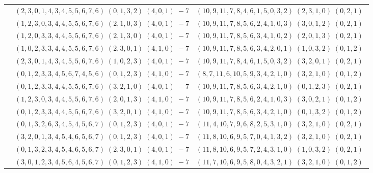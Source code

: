 \documentclass[11pt]{article}
\begin{document}
\begin{longtable}[l]{|c|c|c|}
 \cline{2-3} 
 & $(2 ,3 ,0 ,1 ,4 ,3 ,4 ,5 ,5 ,6 ,7 ,6) \;(0 ,1 ,3 ,2) \;(4 ,0 ,1) \;-7$ & $(10 ,9 ,11 ,7 ,8 ,4 ,6 ,1 ,5 ,0 ,3 ,2) \;(2 ,3 ,1 ,0) \;(0 ,2 ,1) \;$\\ 
 \cline{2-3} 
 & $(1 ,2 ,3 ,0 ,3 ,4 ,4 ,5 ,5 ,6 ,7 ,6) \;(2 ,1 ,0 ,3) \;(4 ,0 ,1) \;-7$ & $(10 ,9 ,11 ,7 ,8 ,5 ,6 ,2 ,4 ,1 ,0 ,3) \;(3 ,0 ,1 ,2) \;(0 ,2 ,1) \;$\\ 
 \cline{2-3} 
 & $(1 ,2 ,0 ,3 ,3 ,4 ,4 ,5 ,5 ,6 ,7 ,6) \;(2 ,1 ,3 ,0) \;(4 ,0 ,1) \;-7$ & $(10 ,9 ,11 ,7 ,8 ,5 ,6 ,3 ,4 ,1 ,0 ,2) \;(2 ,0 ,1 ,3) \;(0 ,2 ,1) \;$\\ 
 \cline{2-3} 
 & $(1 ,0 ,2 ,3 ,3 ,4 ,4 ,5 ,5 ,6 ,7 ,6) \;(2 ,3 ,0 ,1) \;(4 ,1 ,0) \;-7$ & $(10 ,9 ,11 ,7 ,8 ,5 ,6 ,3 ,4 ,2 ,0 ,1) \;(1 ,0 ,3 ,2) \;(0 ,1 ,2) \;$\\ 
 \cline{2-3} 
 & $(2 ,3 ,0 ,1 ,4 ,3 ,4 ,5 ,5 ,6 ,7 ,6) \;(1 ,0 ,2 ,3) \;(4 ,0 ,1) \;-7$ & $(10 ,9 ,11 ,7 ,8 ,4 ,6 ,1 ,5 ,0 ,3 ,2) \;(3 ,2 ,0 ,1) \;(0 ,2 ,1) \;$\\ 
 \cline{2-3} 
 & $(0 ,1 ,2 ,3 ,3 ,4 ,5 ,6 ,7 ,4 ,5 ,6) \;(0 ,1 ,2 ,3) \;(4 ,1 ,0) \;-7$ & $(8 ,7 ,11 ,6 ,10 ,5 ,9 ,3 ,4 ,2 ,1 ,0) \;(3 ,2 ,1 ,0) \;(0 ,1 ,2) \;$\\ 
 \cline{2-3} 
 & $(0 ,1 ,2 ,3 ,3 ,4 ,4 ,5 ,5 ,6 ,7 ,6) \;(3 ,2 ,1 ,0) \;(4 ,0 ,1) \;-7$ & $(10 ,9 ,11 ,7 ,8 ,5 ,6 ,3 ,4 ,2 ,1 ,0) \;(0 ,1 ,2 ,3) \;(0 ,2 ,1) \;$\\ 
 \cline{2-3} 
 & $(1 ,2 ,3 ,0 ,3 ,4 ,4 ,5 ,5 ,6 ,7 ,6) \;(2 ,0 ,1 ,3) \;(4 ,1 ,0) \;-7$ & $(10 ,9 ,11 ,7 ,8 ,5 ,6 ,2 ,4 ,1 ,0 ,3) \;(3 ,0 ,2 ,1) \;(0 ,1 ,2) \;$\\ 
 \cline{2-3} 
 & $(0 ,1 ,2 ,3 ,3 ,4 ,4 ,5 ,5 ,6 ,7 ,6) \;(3 ,2 ,0 ,1) \;(4 ,1 ,0) \;-7$ & $(10 ,9 ,11 ,7 ,8 ,5 ,6 ,3 ,4 ,2 ,1 ,0) \;(0 ,1 ,3 ,2) \;(0 ,1 ,2) \;$\\ 
 \cline{2-3} 
 & $(0 ,1 ,3 ,2 ,6 ,3 ,4 ,5 ,4 ,5 ,6 ,7) \;(0 ,1 ,2 ,3) \;(4 ,0 ,1) \;-7$ & $(11 ,4 ,10 ,7 ,9 ,6 ,8 ,2 ,5 ,3 ,1 ,0) \;(3 ,2 ,1 ,0) \;(0 ,2 ,1) \;$\\ 
 \cline{2-3} 
 & $(3 ,2 ,0 ,1 ,3 ,4 ,5 ,4 ,6 ,5 ,6 ,7) \;(0 ,1 ,2 ,3) \;(4 ,0 ,1) \;-7$ & $(11 ,8 ,10 ,6 ,9 ,5 ,7 ,0 ,4 ,1 ,3 ,2) \;(3 ,2 ,1 ,0) \;(0 ,2 ,1) \;$\\ 
 \cline{2-3} 
 & $(0 ,1 ,3 ,2 ,3 ,4 ,5 ,4 ,6 ,5 ,6 ,7) \;(2 ,3 ,0 ,1) \;(4 ,0 ,1) \;-7$ & $(11 ,8 ,10 ,6 ,9 ,5 ,7 ,2 ,4 ,3 ,1 ,0) \;(1 ,0 ,3 ,2) \;(0 ,2 ,1) \;$\\ 
 \cline{2-3} 
 & $(3 ,0 ,1 ,2 ,3 ,4 ,5 ,6 ,4 ,5 ,6 ,7) \;(0 ,1 ,2 ,3) \;(4 ,1 ,0) \;-7$ & $(11 ,7 ,10 ,6 ,9 ,5 ,8 ,0 ,4 ,3 ,2 ,1) \;(3 ,2 ,1 ,0) \;(0 ,1 ,2) \;$\\ 

\end{longtable}
\end{document}
